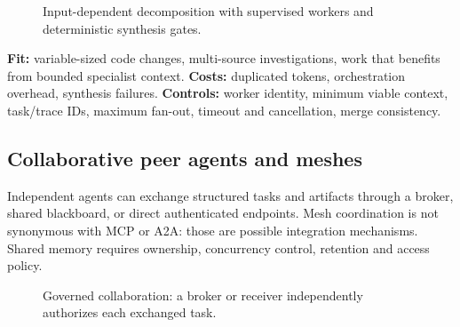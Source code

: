\begin{figure}[htbp]\centering
{}
\caption{Input-dependent decomposition with supervised workers and deterministic synthesis gates.}
\label{fig:supervisor}
\end{figure}

\textbf{Fit:} variable-sized code changes, multi-source investigations, work that benefits from bounded specialist context. \textbf{Costs:} duplicated tokens, orchestration overhead, synthesis failures. \textbf{Controls:} worker identity, minimum viable context, task/trace IDs, maximum fan-out, timeout and cancellation, merge consistency.

\subsection{Collaborative peer agents and meshes}
Independent agents can exchange structured tasks and artifacts through a broker, shared blackboard, or direct authenticated endpoints. Mesh coordination is not synonymous with MCP or A2A: those are possible integration mechanisms. Shared memory requires ownership, concurrency control, retention and access policy.

\begin{figure}[htbp]\centering
{}
\caption{Governed collaboration: a broker or receiver independently authorizes each exchanged task.}
\label{fig:collab}
\end{figure}

